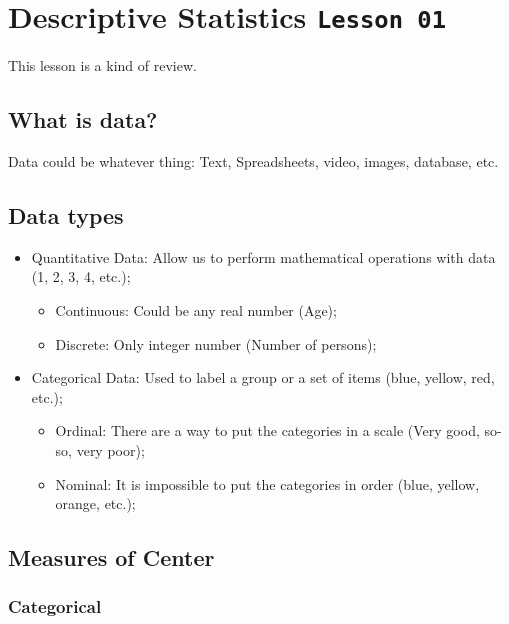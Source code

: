 \documentclass[]{book}
\providecommand{\tightlist}{%
  \setlength{\itemsep}{0pt}\setlength{\parskip}{0pt}}
\begin{document}
\section{\texorpdfstring{Descriptive Statistics
\texttt{Lesson\ 01}}{Descriptive Statistics Lesson 01}}\label{descriptive-statistics-lesson-01}

This lesson is a kind of review.

\subsection{What is data?}\label{what-is-data}

Data could be whatever thing: Text, Spreadsheets, video, images,
database, etc.

\subsection{Data types}\label{data-types}

\begin{itemize}
\tightlist
\item
  Quantitative Data: Allow us to perform mathematical operations with
  data (1, 2, 3, 4, etc.);

  \begin{itemize}
  \tightlist
  \item
    Continuous: Could be any real number (Age);
  \item
    Discrete: Only integer number (Number of persons);
  \end{itemize}
\item
  Categorical Data: Used to label a group or a set of items (blue,
  yellow, red, etc.);

  \begin{itemize}
  \tightlist
  \item
    Ordinal: There are a way to put the categories in a scale (Very
    good, so-so, very poor);
  \item
    Nominal: It is impossible to put the categories in order (blue,
    yellow, orange, etc.);
  \end{itemize}
\end{itemize}

\subsection{Measures of Center}\label{measures-of-center}

\subsubsection{Categorical}\label{categorical}
\end{document}
